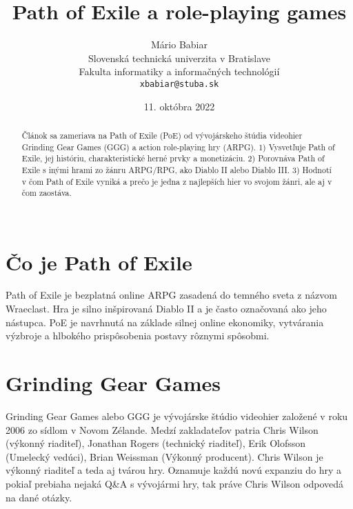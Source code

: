 \documentclass[10pt,twoside,slovak,a4paper]{article}
\title{Path of Exile a role-playing games}
\author{Mário Babiar\\[2pt]
	{\small Slovenská technická univerzita v Bratislave}\\
	{\small Fakulta informatiky a informačných technológií}\\
	{\small \texttt{xbabiar@stuba.sk}}
	}
\date{\small 11. októbra 2022}
\begin{document}
\maketitle

\begin{abstract}
Článok sa zameriava na Path of Exile (PoE) od vývojárskeho štúdia videohier Grinding Gear Games (GGG) a action role-playing hry (ARPG). 1) Vysvetľuje Path of Exile, jej históriu, charakteristické herné prvky a monetizáciu. 2) Porovnáva Path of Exile s inými hrami zo žánru ARPG/RPG, ako Diablo II alebo Diablo III. 3) Hodnotí v čom Path of Exile vyniká a prečo je jedna z najlepších hier vo svojom žánri, ale aj v čom zaostáva.\\\\
\end{abstract}
 
\section{Čo je Path of Exile}
Path of Exile je bezplatná online ARPG zasadená do temného sveta z názvom Wraeclast. Hra je silno inšpirovaná Diablo II a je často označovaná ako jeho nástupca. PoE je navrhnutá na základe silnej online ekonomiky, vytvárania výzbroje a hlbokého prispôsobenia postavy rôznymi spôsobmi.

\section{Grinding Gear Games}
Grinding Gear Games alebo GGG je vývojárske štúdio videohier založené v roku 2006 zo sídlom v Novom Zélande. Medzí zakladateľov patria Chris Wilson (výkonný riaditeľ), Jonathan Rogers (technický riaditeľ), Erik Olofsson (Umelecký vedúci), Brian Weissman (Výkonný producent). Chris Wilson je výkonný riaditeľ a teda aj tvárou hry. Oznamuje každú novú expanziu do hry a pokiaľ prebiaha nejaká Q\&A s vývojármi hry, tak práve Chris Wilson odpovedá na dané otázky.
\end{document}
